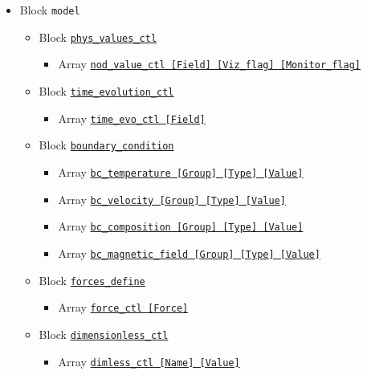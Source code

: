 \begin{itemize}
\begin{itemize}
		{\tt num\_grid\_sph} See Section \ref{section:gen_sph_grid})
	\end{itemize}
%
\item Block \verb|model|
	\begin{itemize}
	\item Block \hyperref[href_t:phys_values_ctl]{\tt phys\_values\_ctl}
		\begin{itemize} \label{href_i:phys_values_ctl}
		\item Array \hyperref[href_t:nod_value_ctl]
			{\tt nod\_value\_ctl    [Field]  [Viz\_flag]  [Monitor\_flag]}
		\end{itemize}
%
	\item Block \hyperref[href_t:time_evolution_ctl]{\tt time\_evolution\_ctl}
		\begin{itemize} \label{href_i:time_evolution_ctl}
		\item Array \hyperref[href_t:time_evo_ctl]
			{\tt time\_evo\_ctl    [Field]}
		\end{itemize}
%
	\item Block \hyperref[href_t:boundary_condition]{\tt boundary\_condition}
		\begin{itemize} \label{href_i:boundary_condition}
		\item Array \hyperref[href_t:bc_temperature]
            {\tt bc\_temperature       [Group]  [Type]  [Value]}
		\item Array \hyperref[href_t:bc_velocity]
			{\tt bc\_velocity          [Group]  [Type]  [Value]}
		\item Array \hyperref[href_t:bc_composition]
			{\tt bc\_composition       [Group]  [Type]  [Value]}
		\item Array \hyperref[href_t:bc_magnetic_field]
			{\tt bc\_magnetic\_field    [Group]  [Type]  [Value]}
		\end{itemize}
%
	\item Block \hyperref[href_t:forces_define]{\tt forces\_define}
		\begin{itemize} \label{href_i:forces_define}
		\item Array \hyperref[href_t:force_ctl]{\tt force\_ctl    [Force]}
		\end{itemize}
%
	\item Block \hyperref[href_t:dimensionless_ctl]{\tt dimensionless\_ctl}
		\begin{itemize} \label{href_i:dimensionless_ctl}
		\item Array \hyperref[href_t:dimless_ctl]{\tt dimless\_ctl    [Name]  [Value]}
		\end{itemize}

\end{itemize}
\end{itemize}
